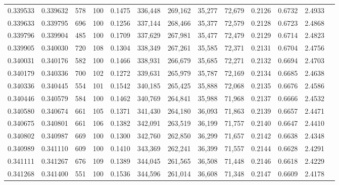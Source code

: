 \begin{tabular}{rrrrrrrrrrrrr}
0.339533 & 0.339632 &   578 & 100 &                                     0.1475 & 336,448 & 269,162 &  35,277 &  72,679 & 0.2126 & 0.6732 & 2.4933 \\
0.339633 & 0.339795 &   696 & 100 &                                     0.1256 & 337,144 & 268,466 &  35,377 &  72,579 & 0.2128 & 0.6723 & 2.4868 \\
0.339796 & 0.339904 &   485 & 100 &                                     0.1709 & 337,629 & 267,981 &  35,477 &  72,479 & 0.2129 & 0.6714 & 2.4823 \\
0.339905 & 0.340030 &   720 & 108 &                                     0.1304 & 338,349 & 267,261 &  35,585 &  72,371 & 0.2131 & 0.6704 & 2.4756 \\
0.340031 & 0.340176 &   582 & 100 &                                     0.1466 & 338,931 & 266,679 &  35,685 &  72,271 & 0.2132 & 0.6694 & 2.4703 \\
0.340179 & 0.340336 &   700 & 102 &                                     0.1272 & 339,631 & 265,979 &  35,787 &  72,169 & 0.2134 & 0.6685 & 2.4638 \\
0.340336 & 0.340445 &   554 & 101 &                                     0.1542 & 340,185 & 265,425 &  35,888 &  72,068 & 0.2135 & 0.6676 & 2.4586 \\
0.340446 & 0.340579 &   584 & 100 &                                     0.1462 & 340,769 & 264,841 &  35,988 &  71,968 & 0.2137 & 0.6666 & 2.4532 \\
0.340580 & 0.340674 &   661 & 105 &                                     0.1371 & 341,430 & 264,180 &  36,093 &  71,863 & 0.2139 & 0.6657 & 2.4471 \\
0.340675 & 0.340801 &   661 & 106 &                                     0.1382 & 342,091 & 263,519 &  36,199 &  71,757 & 0.2140 & 0.6647 & 2.4410 \\
0.340802 & 0.340987 &   669 & 100 &                                     0.1300 & 342,760 & 262,850 &  36,299 &  71,657 & 0.2142 & 0.6638 & 2.4348 \\
0.340989 & 0.341110 &   609 & 100 &                                     0.1410 & 343,369 & 262,241 &  36,399 &  71,557 & 0.2144 & 0.6628 & 2.4291 \\
0.341111 & 0.341267 &   676 & 109 &                                     0.1389 & 344,045 & 261,565 &  36,508 &  71,448 & 0.2146 & 0.6618 & 2.4229 \\
0.341268 & 0.341400 &   551 & 100 &                                     0.1536 & 344,596 & 261,014 &  36,608 &  71,348 & 0.2147 & 0.6609 & 2.4178 \\

\end{tabular}
